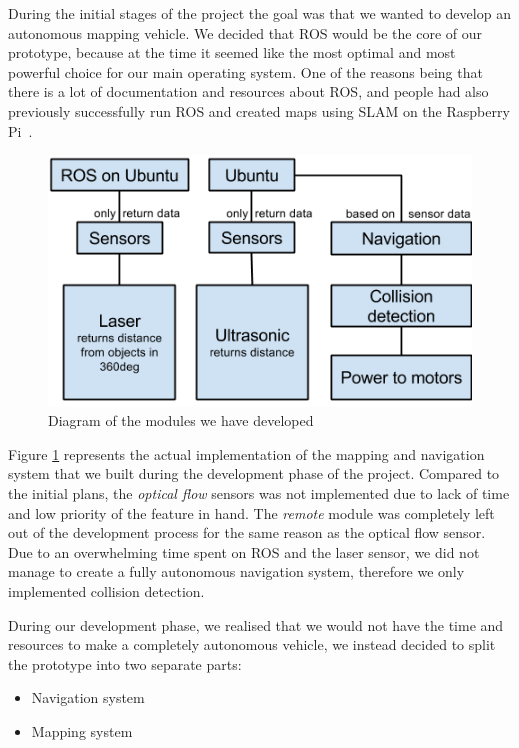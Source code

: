 During the initial stages of the project the goal was that we wanted to develop an autonomous mapping vehicle. We decided that ROS would be the core of our prototype, because at the time it seemed like the most optimal and most powerful choice for our main operating system. One of the reasons being that there is a lot of documentation and resources about ROS, and people had also previously successfully run ROS and created maps using SLAM on the Raspberry Pi~\cite{pibot}\cite{pibotbook}.

\begin{figure}[H]
	\centering
	\includegraphics[scale=.7]{images/developmentdiagram2.png}
	\caption{Diagram of the modules we have developed}
	\label{fig:developmentdiagram2}
\end{figure}

Figure \ref{fig:developmentdiagram2} represents the actual implementation of the mapping and navigation system that we built during the development phase of the project. Compared to the initial plans, the \textit{optical flow} sensors was not implemented due to lack of time and low priority of the feature in hand. The \textit{remote} module was completely left out of the development process for the same reason as the optical flow sensor. Due to an overwhelming time spent on ROS and the laser sensor, we did not manage to create a fully autonomous navigation system, therefore we only implemented collision detection.

During our development phase, we realised that we would not have the time and resources to make a completely autonomous vehicle, we instead decided to split the prototype into two separate parts: 
\begin{itemize}
	\item Navigation system
	\item Mapping system
\end{itemize}

